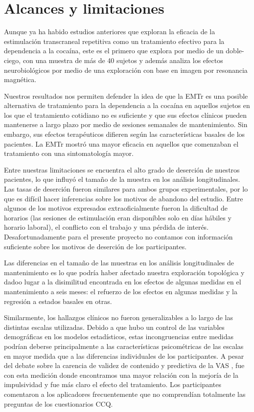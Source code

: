 \section{Alcances y limitaciones}
Aunque ya ha habido estudios anteriores que exploran la eficacia de la estimulación transcraneal repetitiva como un tratamiento efectivo para la dependencia a la cocaína, este es el primero que explora por medio de un doble-ciego, con una muestra de más de 40 sujetos y además analiza los efectos neurobiológicos por medio de una exploración con base en imagen por resonancia magnética. \par
Nuestros resultados nos permiten defender la idea de que la EMTr es una posible alternativa de tratamiento para la dependencia a la cocaína en aquellos sujetos en los que el tratamiento cotidiano no es suficiente y que sus efectos clínicos pueden mantenerse a largo plazo por medio de sesiones semanales de mantenimiento. Sin embargo, sus efectos terapéuticos difieren según las características basales de los pacientes. La EMTr mostró una mayor eficacia en aquellos que comenzaban el tratamiento con una sintomatología mayor. \par
Entre nuestras limitaciones se encuentra el alto grado de deserción de nuestros pacientes, lo que influyó el tamaño de la muestra en los análisis longitudinales. Las tasas de deserción fueron similares para ambos grupos experimentales, por lo que es difícil hacer inferencias sobre los motivos de abandono del estudio. Entre algunos de los motivos expresados extraoficialmente fueron la dificultad de horarios (las sesiones de estimulación eran disponíbles solo en días hábiles y horario laboral), el conflicto con el trabajo y una pérdida de interés. Desafortunadamente para el presente proyecto no contamos con información suficiente sobre los motivos de deserción de los participantes.\par
Las diferencias en el tamaño de las muestras en los análisis longitudinales de mantenimiento es lo que podría haber afectado nuestra exploración topológica y dadoo lugar a la disimilitud encontrada en los efectos de algunas medidas en el mantenimiento a seis meses: el refuerzo de los efectos en algunas medidas y la regresión a estados basales en otras. \par
Similarmente, los hallazgos clínicos no fueron generalizables a lo largo de las distintas escalas utilizadas. Debido a que hubo un control de las variables demográficas en los modelos estadísticos, estas incongruencias entre medidas podrían deberse principalmente a las características psicométricas de las escalas en mayor medida que a las diferencias individuales de los participantes. A pesar del debate sobre la carencia de validez de contenido y predictiva de la VAS \parencite{Ekhtiari2019}, fue con esta medición donde encontramos una mayor relación con la mejoría de la impulsividad y fue más claro el efecto del tratamiento. Los participantes comentaron a los aplicadores frecuentemente que no comprendían totalmente las preguntas de los cuestionarios CCQ. \par
